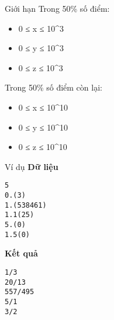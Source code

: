 Giới hạn  
Trong 50\% số điểm:  
\begin{itemize}
	\item     0 ≤ x ≤ 10^3   
	\item     0 ≤ y ≤ 10^3   
	\item     0 ≤ z ≤ 10^3   
\end{itemize}

   Trong 50\% số điểm còn lại:  
\begin{itemize}
	\item     0 ≤ x ≤ 10^10   
	\item     0 ≤ y ≤ 10^10   
	\item     0 ≤ z ≤ 10^10   
\end{itemize}
   Ví dụ  
\textbf{    Dữ liệu   }
\begin{verbatim}
5
0.(3)
1.(538461)
1.1(25)
5.(0)
1.5(0)
\end{verbatim}

\textbf{    Kết quả   }
\begin{verbatim}
1/3
20/13
557/495
5/1
3/2
\end{verbatim}